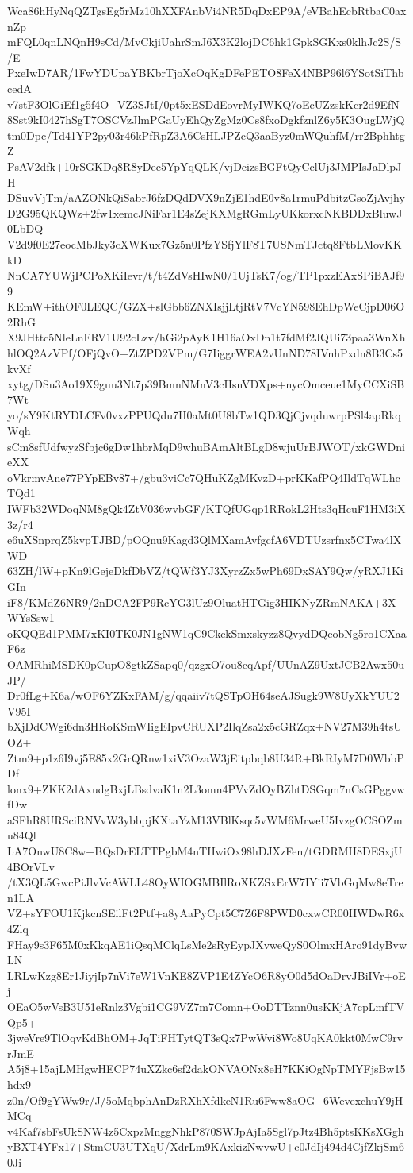 Wca86hHyNqQZTgsEg5rMz10hXXFAnbVi4NR5DqDxEP9A/eVBahEcbRtbaC0axnZp
mFQL0qnLNQnH9sCd/MvCkjiUahrSmJ6X3K2lojDC6hk1GpkSGKxs0klhJc2S/S/E
PxeIwD7AR/1FwYDUpaYBKbrTjoXcOqKgDFePETO8FeX4NBP96l6YSotSiThbcedA
v7stF3OlGiEf1g5f4O+VZ3SJtI/0pt5xESDdEovrMyIWKQ7oEcUZzskKcr2d9EfN
8Sst9kI0427hSgT7OSCVzJlmPGaUyEhQyZgMz0Cs8fxoDgkfznlZ6y5K3OugLWjQ
tm0Dpc/Td41YP2py03r46kPfRpZ3A6CsHLJPZcQ3aaByz0mWQuhfM/rr2BphhtgZ
PsAV2dfk+10rSGKDq8R8yDec5YpYqQLK/vjDcizsBGFtQyCclUj3JMPIsJaDlpJH
DSuvVjTm/aAZONkQiSabrJ6fzDQdDVX9nZjE1hdE0v8a1rmuPdbitzGsoZjAvjhy
D2G95QKQWz+2fw1xemcJNiFar1E4sZejKXMgRGmLyUKkorxcNKBDDxBluwJ0LbDQ
V2d9f0E27eocMbJky3cXWKux7Gz5n0PfzYSfjYlF8T7USNmTJctq8FtbLMovKKkD
NnCA7YUWjPCPoXKiIevr/t/t4ZdVsHIwN0/1UjTsK7/og/TP1pxzEAxSPiBAJf99
KEmW+ithOF0LEQC/GZX+slGbb6ZNXIsjjLtjRtV7VcYN598EhDpWeCjpD06O2RhG
X9JHttc5NleLnFRV1U92cLzv/hGi2pAyK1H16aOxDn1t7fdMf2JQUi73paa3WnXh
hlOQ2AzVPf/OFjQvO+ZtZPD2VPm/G7IiggrWEA2vUnND78IVnhPxdn8B3Cs5kvXf
xytg/DSu3Ao19X9guu3Nt7p39BmnNMnV3cHsnVDXps+nycOmceue1MyCCXiSB7Wt
yo/sY9KtRYDLCFv0vxzPPUQdu7H0aMt0U8bTw1QD3QjCjvqduwrpPSl4apRkqWqh
sCm8sfUdfwyzSfbjc6gDw1hbrMqD9whuBAmAltBLgD8wjuUrBJWOT/xkGWDnieXX
oVkrmvAne77PYpEBv87+/gbu3viCc7QHuKZgMKvzD+prKKafPQ4IldTqWLhcTQd1
IWFb32WDoqNM8gQk4ZtV036wvbGF/KTQfUGqp1RRokL2Hts3qHcuF1HM3iX3z/r4
e6uXSnprqZ5kvpTJBD/pOQnu9Kagd3QlMXamAvfgcfA6VDTUzsrfnx5CTwa4lXWD
63ZH/lW+pKn9lGejeDkfDbVZ/tQWf3YJ3XyrzZx5wPh69DxSAY9Qw/yRXJ1KiGIn
iF8/KMdZ6NR9/2nDCA2FP9RcYG3lUz9OluatHTGig3HIKNyZRmNAKA+3XWYsSsw1
oKQQEd1PMM7xKI0TK0JN1gNW1qC9CkckSmxskyzz8QvydDQcobNg5ro1CXaaF6z+
OAMRhiMSDK0pCupO8gtkZSapq0/qzgxO7ou8cqApf/UUnAZ9UxtJCB2Awx50uJP/
Dr0fLg+K6a/wOF6YZKxFAM/g/qqaiiv7tQSTpOH64seAJSugk9W8UyXkYUU2V95I
bXjDdCWgi6dn3HRoKSmWIigEIpvCRUXP2IlqZsa2x5cGRZqx+NV27M39h4tsUOZ+
Ztm9+p1z6I9vj5E85x2GrQRnw1xiV3OzaW3jEitpbqb8U34R+BkRIyM7D0WbbPDf
lonx9+ZKK2dAxudgBxjLBsdvaK1n2L3omn4PVvZdOyBZhtDSGqm7nCsGPggvwfDw
aSFhR8URSciRNVvW3ybbpjKXtaYzM13VBlKsqc5vWM6MrweU5IvzgOCSOZmu84Ql
LA7OnwU8C8w+BQsDrELTTPgbM4nTHwiOx98hDJXzFen/tGDRMH8DESxjU4BOrVLv
/tX3QL5GwcPiJlvVcAWLL48OyWIOGMBIlRoXKZSxErW7IYii7VbGqMw8eTren1LA
VZ+sYFOU1KjkcnSEilFt2Ptf+a8yAaPyCpt5C7Z6F8PWD0cxwCR00HWDwR6x4Zlq
FHay9s3F65M0xKkqAE1iQsqMClqLsMe2sRyEypJXvweQyS0OlmxHAro91dyBvwLN
LRLwKzg8Er1JiyjIp7nVi7eW1VnKE8ZVP1E4ZYcO6R8yO0d5dOaDrvJBiIVr+oEj
OEaO5wVsB3U51eRnlz3Vgbi1CG9VZ7m7Comn+OoDTTznn0usKKjA7cpLmfTVQp5+
3jweVre9TlOqvKdBhOM+JqTiFHTytQT3sQx7PwWvi8Wo8UqKA0kkt0MwC9rvrJmE
A5j8+15ajLMHgwHECP74uXZkc6sf2dakONVAONx8eH7KKiOgNpTMYFjsBw15hdx9
z0n/Of9gYWw9r/J/5oMqbphAnDzRXhXfdkeN1Ru6Fww8aOG+6WevexchuY9jHMCq
v4Kaf7sbFsUkSNW4z5CxpzMnggNhkP870SWJpAjIa5Sgl7pJtz4Bh5ptsKKsXGgh
yBXT4YFx17+StmCU3UTXqU/XdrLm9KAxkizNwvwU+c0JdIj494d4CjfZkjSm60Ji
